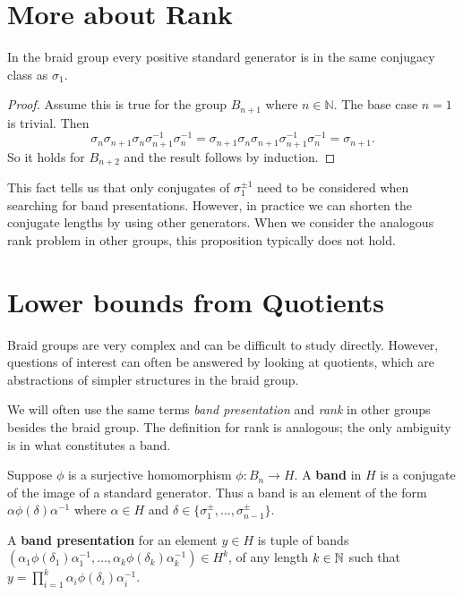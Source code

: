 \documentclass[12pt]{thesis}
\begin{document}
\section{More about Rank}

\begin{proposition} \cite{rudolph-braided-surfaces}
    In the braid group every positive standard
    generator is in the same conjugacy class
    as $\sigma_{1}$.
\end{proposition}

\begin{proof}
    Assume this is true for the group $B_{n+1}$ where $n \in \mathbb{N}$.
    The base case $n = 1$ is trivial.
    Then
    \[
    \sigma_{n}\sigma_{n+1} \sigma_{n} \sigma_{n + 1}^{-1} \sigma_{n}^{-1}
        = \sigma_{n+1} \sigma_{n} \sigma_{n + 1} \sigma_{n + 1}^{-1} \sigma_{n}^{-1}
        = \sigma_{n + 1}.
    \]
    So it holds for $B_{n+2}$ and the result follows by induction.
\end{proof}
This fact tells us that only conjugates of $\sigma_{1}^{\pm 1}$
need to be considered when searching for band presentations.
However, in practice we can shorten the conjugate lengths by using other generators.
When we consider the analogous rank problem in other groups,
this proposition typically does not hold.

\section{Lower bounds from Quotients}

Braid groups are very complex and can be difficult to study directly.
However, questions of interest can often be answered by looking
at quotients, which are abstractions of simpler structures in the braid group.

We will often use the same terms \textit{band presentation} and \textit{rank}
in other groups besides the braid group.
The definition for rank is analogous; the only ambiguity is in what constitutes a band.
\begin{definition}
    Suppose $\phi$ is a surjective homomorphism $\phi \colon B_{n} \rightarrow H$.
    A \textbf{band} in $H$ is a conjugate of the image of a standard generator.
    Thus a band is an element of the form $\alpha\phi(\delta)\alpha^{-1}$
    where $\alpha \in H$ and $\delta \in \{\sigma_{1}^{\pm}, \ldots, \sigma_{n-1}^{\pm} \}$.
\end{definition}

\begin{definition}
    \label{def:quotient-band-presentation}
    \begin{sloppypar}
    A \textbf{band presentation} for an element $y \in H$
    is tuple of bands $(\alpha_{1} \phi(\delta_{1}) \alpha_{1}^{-1}, \ldots,
        \alpha_{k} \phi(\delta_{k}) \alpha_{k}^{-1}) \in H^{k}$,
    of any length $k \in \mathbb{N}$
        such that $y = \prod_{i=1}^{k} \alpha_{i} \phi(\delta_{i}) \alpha_{i}^{-1}$.
    \end{sloppypar}
\end{definition}
\end{document}
